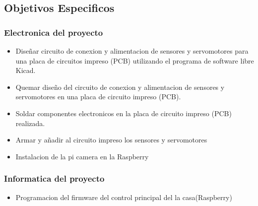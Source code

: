\documentclass[letterpaper,12pt]{article}
\begin{document}
{		
		\subsection{Objetivos Especificos}
		
		\subsubsection{Electronica del proyecto}
		
		\begin{itemize}
			
			\item Diseñar circuito de conexion y alimentacion de sensores y servomotores para una placa de circuitos impreso (PCB) utilizando el programa de software libre Kicad.
			
			\item Quemar diseño del circuito de conexion y alimentacion de sensores y servomotores en una placa de circuito  impreso (PCB).
			
			\item Soldar componentes electronicos en la placa de circuito impreso (PCB) realizada.
			
			\item Armar y añadir al circuito impreso los sensores y servomotores 
			
			\item Instalacion de la pi camera en la Raspberry
			
		\end{itemize}
		
		
		\subsubsection{Informatica del proyecto}
		
		\begin{itemize}
			\item Programacion del firmware del control principal del la casa(Raspberry)
			

\end{itemize}}
\end{document}
